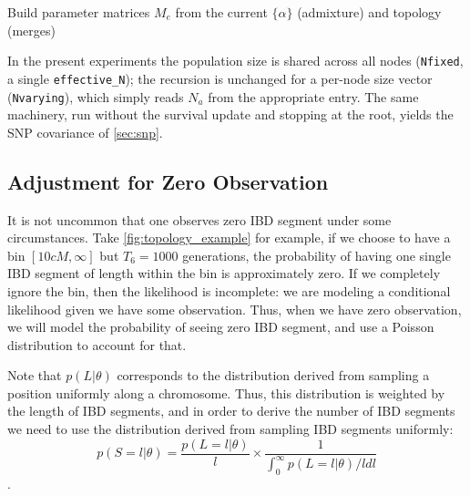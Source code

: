 \documentclass[12pt]{article}
\theoremstyle{definition}
\theoremstyle{definition}
\theoremstyle{lemma}
\theoremstyle{remark}
\theoremstyle{definition}
\begin{document}
\begin{algorithm}[H]
\caption{Expected IBD fraction for all leaf pairs and length bins}\label{alg:ibd}
\DontPrintSemicolon
{}
Build parameter matrices $M_e$ from the current $\{\alpha\}$ (admixture) and topology (merges)\;
\end{algorithm}

In the present experiments the population size is shared across all nodes
(\texttt{Nfixed}, a single \texttt{effective\_N}); the recursion is unchanged for
a per-node size vector (\texttt{Nvarying}), which simply reads $N_a$ from the
appropriate entry. The same machinery, run without the survival update and
stopping at the root, yields the SNP covariance of \cref{sec:snp}.
\subsection{Adjustment for Zero Observation}\label{sec:zero}
It is not uncommon that one observes zero IBD segment under some circumstances. Take \cref{fig:topology_example} for example, if we choose to have a bin $[10cM,\infty]$ but $T_6 = 1000$ generations, the probability of having one single IBD segment of length within the bin is approximately zero. If we completely ignore the bin, then the likelihood is incomplete: we are modeling a conditional likelihood given we have some observation. Thus, when we have zero observation, we will model the probability of seeing zero IBD segment, and use a Poisson distribution to account for that.

Note that $p(L|\theta)$ corresponds to the distribution derived from sampling a position uniformly along a chromosome. Thus, this distribution is weighted by the length of IBD segments, and in order to derive the number of IBD segments we need to use the distribution derived from sampling IBD segments uniformly:\[p(S=l|\theta) = \frac{p(L=l|\theta)}{l}\times\frac{1}{\int_{0}^\infty p(L=l|\theta)/l dl} \].
\end{document}
